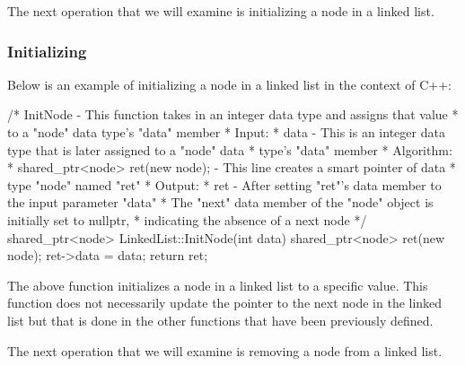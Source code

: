 The next operation that we will examine is initializing a node in a linked list.

\begin{highlight}

\subsubsection*{Initializing}

Below is an example of initializing a node in a linked list in the context of C++:

\begin{code}
/*  InitNode - This function takes in an integer data type and assigns that value 
*   to a "node" data type's "data" member
*   Input:
*     data - This is an integer data type that is later assigned to a "node" data 
*     type's "data" member
*   Algorithm:
*     shared_ptr<node> ret(new node); - This line creates a smart pointer of data 
*     type "node" named "ret"
*   Output:
*     ret - After setting "ret"'s data member to the input parameter "data"
*     The "next" data member of the "node" object is initially set to nullptr, 
*     indicating the absence of a next node
*/
shared_ptr<node> LinkedList::InitNode(int data){
    shared_ptr<node> ret(new node);
    ret->data = data;
    return ret;
}
\end{code}

The above function initializes a node in a linked list to a specific value. This function does not necessarily update the pointer to the next node in the linked list but that is done in the other
functions that have been previously defined.

\end{highlight}

The next operation that we will examine is removing a node from a linked list.

